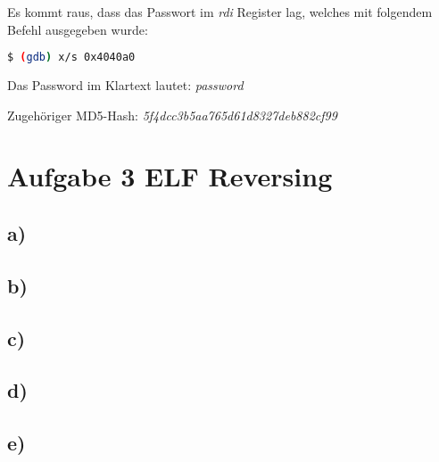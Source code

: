 Es kommt raus, dass das Passwort im \textit{rdi} Register lag, welches mit folgendem Befehl ausgegeben wurde:

\begin{lstlisting}[language=bash]
    $ (gdb) x/s 0x4040a0
\end{lstlisting}

Das Password im Klartext lautet: \textit{password}

Zugehöriger MD5-Hash: \textit{5f4dcc3b5aa765d61d8327deb882cf99}

\section*{Aufgabe 3 ELF Reversing}

\subsection*{a)}

\subsection*{b)}

\subsection*{c)}

\subsection*{d)}

\subsection*{e)}

